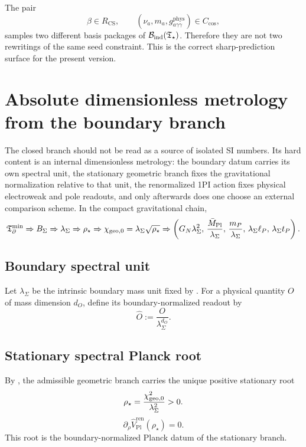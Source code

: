 \begin{remark}
The pair
\[
\beta\in R_{\mathrm{CS}},
\qquad
(\nu_a,m_a,g_{a\gamma\gamma}^{\mathrm{phys}})\in C_{\mathrm{cos}},
\]
samples two different basis packages of $\mathcal B_{\mathrm{ind}}(\mathfrak T_{\star})$. Therefore they are not two rewritings of
the same seed constraint. This is the correct sharp-prediction surface for the present version.
\end{remark}

\section{Absolute dimensionless metrology from the boundary branch}
\label{sec:absolute-dimensionless-metrology}

The closed branch should not be read as a source of isolated SI numbers. Its hard content is an
internal dimensionless metrology: the boundary datum carries its own spectral unit, the stationary
geometric branch fixes the gravitational normalization relative to that unit, the renormalized 1PI
action fixes physical electroweak and pole readouts, and only afterwards does one choose an
external comparison scheme.
In the compact gravitational chain,
\[
\mathfrak T_{\partial}^{\min}
\Rightarrow
B_\Sigma
\Rightarrow
\lambda_\Sigma
\Rightarrow
\rho_\star
\Rightarrow
\chi_{\mathrm{geo},0}=\lambda_\Sigma\sqrt{\rho_\star}
\Rightarrow
\left(
G_N\lambda_\Sigma^2,\,
\frac{\bar M_{\mathrm{Pl}}}{\lambda_\Sigma},\,
\frac{m_P}{\lambda_\Sigma},\,
\lambda_\Sigma\ell_P,\,
\lambda_\Sigma t_P
\right).
\]

\subsection{Boundary spectral unit}

\begin{definition}
\label{def:boundary-spectral-unit}
Let $\lambda_\Sigma$ be the intrinsic boundary mass unit fixed by
. For a physical quantity $O$ of mass dimension $d_O$,
define its boundary-normalized readout by
\[
\widehat O:=\frac{O}{\lambda_\Sigma^{d_O}}.
\]
\end{definition}

\subsection{Stationary spectral Planck root}

\begin{corollary}
\label{thm:unique-stationary-spectral-planck-root}
By , the admissible geometric branch carries the unique
positive stationary root
\[
\rho_\star=\frac{\chi_{\mathrm{geo},0}^2}{\lambda_\Sigma^2}>0.
\]
\[
\partial_\rho\widehat V_{\mathrm{Pl}}^{\mathrm{ren}}(\rho_\star)=0.
\]
This root is the boundary-normalized Planck datum of the stationary branch.
\end{corollary}

